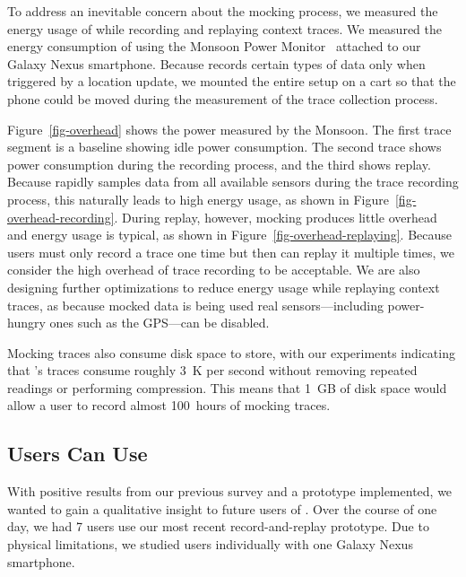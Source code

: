 
To address an inevitable concern about the mocking process, we measured the
energy usage of \PocketMocker{} while recording and replaying context traces.
We measured the energy consumption of \PocketMocker{} using the Monsoon Power
Monitor~\cite{monsoon-url} attached to our Galaxy Nexus smartphone. Because
\PocketMocker{} records certain types of data only when triggered by a
location update, we mounted the entire setup on a cart so that the phone
could be moved during the measurement of the trace collection process.

Figure~\ref{fig-overhead} shows the power measured by the Monsoon. The first
trace segment is a baseline showing idle power consumption. The second trace
shows power consumption during the recording process, and the third shows
replay. Because \PocketMocker{} rapidly samples data from all available
sensors during the trace recording process, this naturally leads to high
energy usage, as shown in Figure~\ref{fig-overhead-recording}. During replay,
however, mocking produces little overhead and energy usage is typical, as
shown in Figure~\ref{fig-overhead-replaying}. Because users must only record
a trace one time but then can replay it multiple times, we consider the high
overhead of trace recording to be acceptable. We are also designing further
optimizations to reduce energy usage while replaying context traces, as
because mocked data is being used real sensors---including power-hungry ones
such as the GPS---can be disabled.

Mocking traces also consume disk space to store, with our experiments
indicating that \PocketMocker{}'s traces consume roughly 3~K per second
without removing repeated readings or performing compression. This means that
1~GB of disk space would allow a user to record almost 100~hours of mocking
traces.

\subsection{Users Can Use \PocketMocker{}}
\label{subsec-usability}


With positive results from our previous survey and a prototype implemented, we 
wanted to gain a qualitative insight to future users of \PocketMocker{}. Over 
the course of one day, we had 7 users use our most recent record-and-replay 
prototype. Due to physical limitations, we studied users individually with one 
Galaxy Nexus smartphone. 

